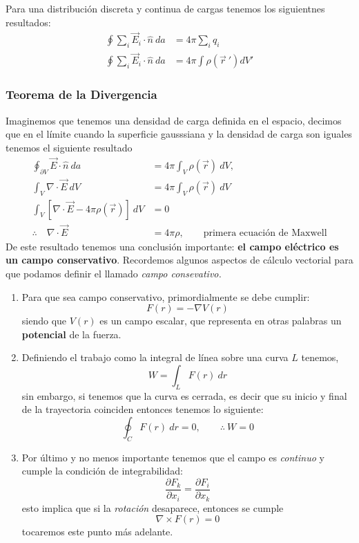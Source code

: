 \documentclass[11pt,a4paper]{article}
\begin{document}
Para una distribución discreta y continua de cargas tenemos los siguientnes resultados:
\begin{align*}
\oint \sum_i \vec{E}_i\cdot\hat{n}\ da&=4\pi\sum_i q_i\\
\oint \sum_i \vec{E}_i\cdot\hat{n}\ da&=4\pi\int \rho(\vec{r}\ ') dV'
\end{align*}

\subsubsection{Teorema de la Divergencia}
Imaginemos que tenemos una densidad de carga definida en el espacio, decimos que en el límite cuando la superficie gausssiana y la densidad de carga son iguales tenemos el siguiente resultado
\begin{align*}
\oint_{\partial V}\vec{E}\cdot\hat{n}\ da&=4\pi\int_V \rho(\vec{r})\ dV,\\
\int_V\nabla\cdot\vec{E}\ dV&=4\pi\int_V \rho(\vec{r})\ dV\\
\int_V\left[\nabla\cdot\vec{E}-4\pi\rho(\vec{r})\right]\ dV&=0\\
\therefore\quad \nabla\cdot\vec{E}&=4\pi\rho,\qquad\text{primera ecuación de Maxwell}
\end{align*}
De este resultado tenemos una conclusión importante: \textbf{el campo eléctrico es un campo conservativo}. Recordemos algunos aspectos de cálculo vectorial para que podamos definir el llamado \emph{campo consevativo.}
\begin{enumerate}
\item Para que sea campo conservativo, primordialmente se debe cumplir:
\begin{equation}\label{eq:campoConservativo}
F(r)=-\nabla V(r)
\end{equation}
siendo que $V(r)$ es un campo escalar, que representa en otras palabras un \textbf{potencial} de la fuerza.
\item Definiendo el trabajo como la integral de línea sobre una curva $L$ tenemos,
\begin{equation}\label{eq:trabajo}
W=\int_L F(r)\ dr
\end{equation}
sin embargo, si tenemos que la curva es cerrada, es decir que su inicio y final de la trayectoria coinciden entonces tenemos lo siguiente:
\begin{equation}\label{eq:trabajoCerrado}
\oint_C F(r)\ dr=0,\qquad\therefore\ W=0
\end{equation}
\item Por último y no menos importante tenemos que el campo es \emph{continuo} y cumple la condición de integrabilidad:
$$\frac{\partial F_k}{\partial x_i}=\frac{\partial F_i}{\partial x_k}$$
esto implica que si la \emph{rotación} desaparece, entonces se cumple 
\begin{equation}\label{eq:rotacionalCero}
\nabla \times F(r)=0
\end{equation} 
tocaremos este punto más adelante.
\end{enumerate}
\end{document}
